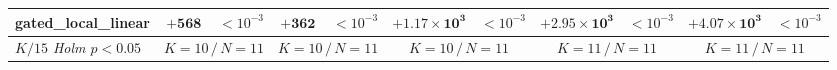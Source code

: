 \begin{tabular}{@{}l rr rr rr rr rr@{}}
gated\_local\_linear & $\mathbf{+568}$ & $<\!10^{-3}$ & $\mathbf{+362}$ & $<\!10^{-3}$ & $\mathbf{+1.17{\times}10^{3}}$ & $<\!10^{-3}$ & $\mathbf{+2.95{\times}10^{3}}$ & $<\!10^{-3}$ & $\mathbf{+4.07{\times}10^{3}}$ & $<\!10^{-3}$ \\
\midrule
\emph{$K/15$ Holm $p<0.05$} & \multicolumn{2}{c}{$K{=}10\,/\,N{=}11$} & \multicolumn{2}{c}{$K{=}10\,/\,N{=}11$} & \multicolumn{2}{c}{$K{=}10\,/\,N{=}11$} & \multicolumn{2}{c}{$K{=}11\,/\,N{=}11$} & \multicolumn{2}{c}{$K{=}11\,/\,N{=}11$} \\
\bottomrule
\end{tabular}